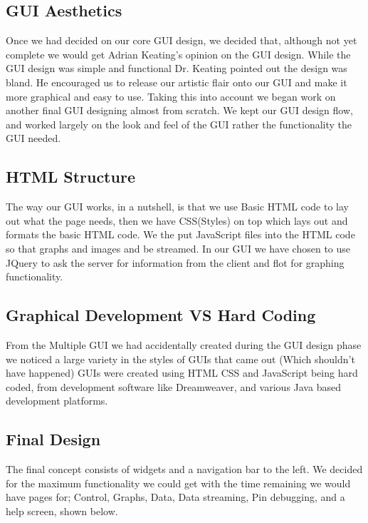 \subsection{GUI Aesthetics}

Once we had decided on our core GUI design, we decided that, although not yet complete we would get Adrian Keating's opinion on the GUI design. While the GUI design was simple and functional Dr. Keating pointed out the design was bland. He encouraged us to release our artistic flair onto our GUI and make it more graphical and easy to use. Taking this into account we began work on another final GUI designing almost from scratch. We kept our GUI design flow, and worked largely on the look and feel of the GUI rather the functionality the GUI needed. 

\subsection{HTML Structure}

The way our GUI works, in a nutshell, is that we use Basic HTML code to lay out what the page needs, then we have CSS(Styles) on top which lays out and formats the basic HTML code. We the put JavaScript files into the HTML code so that graphs and images and be streamed. In our GUI we have chosen to use JQuery to ask the server for information from the client and flot for graphing functionality. 

\subsection{Graphical Development VS Hard Coding}

From the Multiple GUI we had accidentally created during the GUI design phase we noticed a large variety in the styles of GUIs that came out (Which shouldn't have happened) GUIs were created using HTML CSS and JavaScript being hard coded, from development software like Dreamweaver, and various Java based development platforms. 

\subsection{Final Design}

The final concept consists of widgets and a navigation bar to the left. We decided for the maximum functionality we could get with the time remaining we would have pages for; Control, Graphs, Data, Data streaming,  Pin debugging, and a help screen, shown below.

